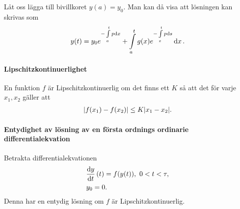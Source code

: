 Låt oss lägga till bivillkoret $y(a) = y_0$. Man kan då visa att lösningen kan skrivas som
\begin{align*}
	y(t) = y_0e^{-\int\limits_{a}^{t}p\dd{x}} + \int\limits_{a}^{t}g(x)e^{-\int\limits_{x}^{t}p\dd{s}}\dd{x}.
\end{align*}

\paragraph{Lipschitzkontinuerlighet}
En funktion $f$ är Lipschitzkontinuerlig om det finns ett $K$ så att det för varje $x_1, x_2$ gäller att
\begin{align*}
	\abs{f(x_1) - f(x_2)} \leq K\abs{x_1 - x_2}.
\end{align*}

\paragraph{Entydighet av lösning av en första ordnings ordinarie differentialekvation}
Betrakta differentialekvationen
\begin{align*}
	&\dv{y}{t} \left(t\right) = f(y(t)),\ 0 < t < \tau, \\
	&y_0 = 0.
\end{align*}
Denna har en entydig lösning om $f$ är Lipschitzkontinuerlig.